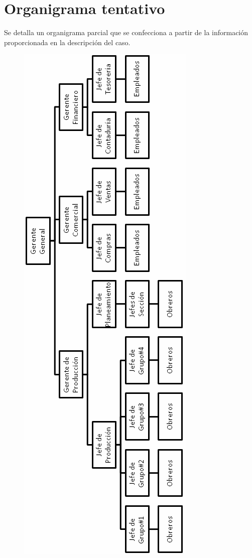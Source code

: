 \newpage
\section{Organigrama tentativo}
Se detalla un organigrama parcial que se confecciona a partir de la informaci\'on proporcionada en la descripci\'on del caso.

\begin{figure}[H]
\centering
\includegraphics[scale=0.75]{images/organigrama-hercules.png}
\end{figure}

